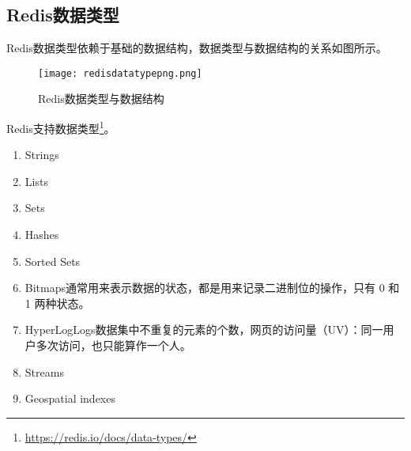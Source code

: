 \documentclass[../../../interview-questions.tex]{subfiles}
\begin{document}
\subsection{Redis数据类型}

Redis数据类型依赖于基础的数据结构，数据类型与数据结构的关系如图所示。

\begin{figure}[htbp]
	\centering
	\texttt{[image: redisdatatypepng.png]}
	\caption{Redis数据类型与数据结构}
	\label{fig:redisdatatypepng}
\end{figure}

Redis支持数据类型\footnote{\url{https://redis.io/docs/data-types/}}。

\begin{enumerate}
    \item {Strings}
    \item {Lists}
    \item {Sets}
    \item {Hashes}
    \item {Sorted Sets}
    \item {Bitmaps}通常用来表示数据的状态，都是用来记录二进制位的操作，只有 0 和 1 两种状态。
    \item {HyperLogLogs}数据集中不重复的元素的个数，网页的访问量（UV）：同一用户多次访问，也只能算作一个人。
    \item {Streams}
    \item {Geospatial indexes}
\end{enumerate}
\end{document}
